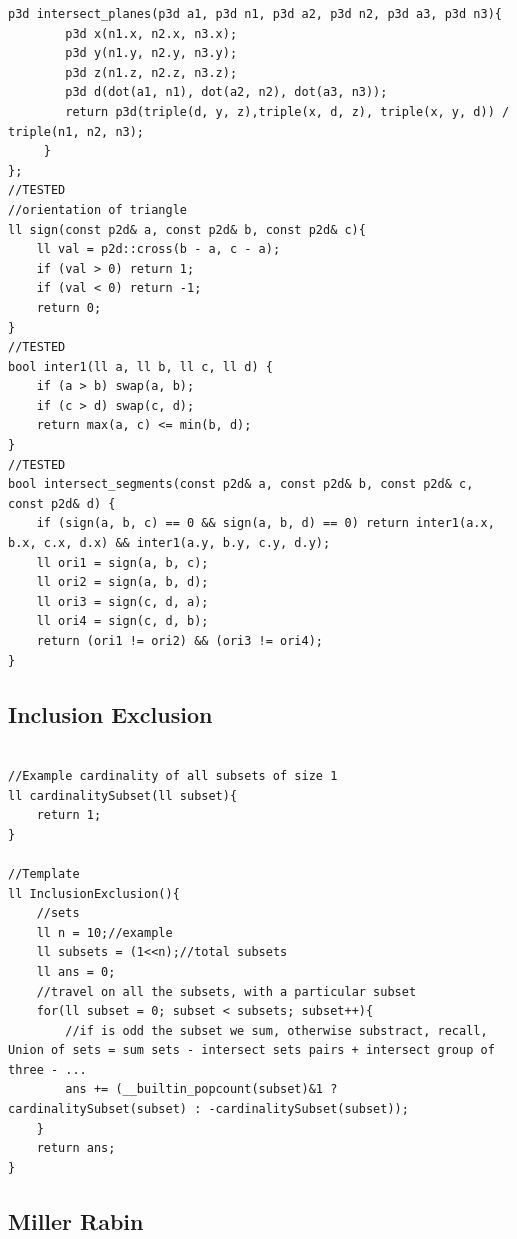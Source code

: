 \documentclass[10pt,a4paper,twocolumn]{article}
\begin{document}
\begin{lstlisting}[style=cpp, title={GeometryStructures.cpp}]
    p3d intersect_planes(p3d a1, p3d n1, p3d a2, p3d n2, p3d a3, p3d n3){
        p3d x(n1.x, n2.x, n3.x);
        p3d y(n1.y, n2.y, n3.y);
        p3d z(n1.z, n2.z, n3.z); 
        p3d d(dot(a1, n1), dot(a2, n2), dot(a3, n3));
        return p3d(triple(d, y, z),triple(x, d, z), triple(x, y, d)) / triple(n1, n2, n3);
     }
};
//TESTED
//orientation of triangle
ll sign(const p2d& a, const p2d& b, const p2d& c){
    ll val = p2d::cross(b - a, c - a);
    if (val > 0) return 1;
    if (val < 0) return -1;
    return 0;
}
//TESTED
bool inter1(ll a, ll b, ll c, ll d) {
    if (a > b) swap(a, b);
    if (c > d) swap(c, d);
    return max(a, c) <= min(b, d);
}
//TESTED
bool intersect_segments(const p2d& a, const p2d& b, const p2d& c, const p2d& d) {
    if (sign(a, b, c) == 0 && sign(a, b, d) == 0) return inter1(a.x, b.x, c.x, d.x) && inter1(a.y, b.y, c.y, d.y);
    ll ori1 = sign(a, b, c);
    ll ori2 = sign(a, b, d);
    ll ori3 = sign(c, d, a);
    ll ori4 = sign(c, d, b);
    return (ori1 != ori2) && (ori3 != ori4);
}
	\end{lstlisting}

	\subsection{Inclusion Exclusion}
	
	\begin{lstlisting}[style=cpp, title={InclusionExclusion.cpp}]

//Example cardinality of all subsets of size 1
ll cardinalitySubset(ll subset){
    return 1;
}

//Template
ll InclusionExclusion(){
    //sets
    ll n = 10;//example
    ll subsets = (1<<n);//total subsets
    ll ans = 0;
    //travel on all the subsets, with a particular subset
    for(ll subset = 0; subset < subsets; subset++){
        //if is odd the subset we sum, otherwise substract, recall, Union of sets = sum sets - intersect sets pairs + intersect group of three - ...
        ans += (__builtin_popcount(subset)&1 ? cardinalitySubset(subset) : -cardinalitySubset(subset));
    }
    return ans;
}
	\end{lstlisting}

	\subsection{Miller Rabin}
	
\end{document}
